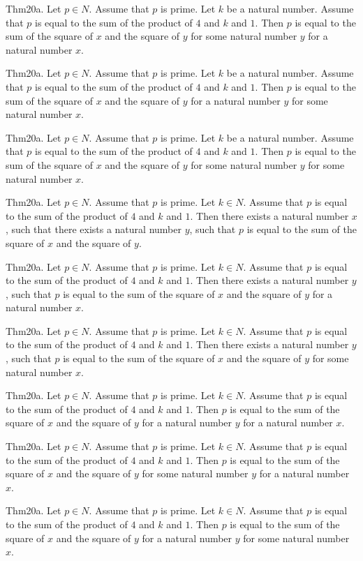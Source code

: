 \documentclass{article}
\begin{document}
Thm20a. Let $p \in N$. Assume that $p$ is prime. Let $k$ be a natural number. Assume that $p$ is equal to the sum of the product of $4$ and $k$ and $1$. Then $p$ is equal to the sum of the square of $x$ and the square of $y$ for some natural number $y$ for a natural number $x$.

Thm20a. Let $p \in N$. Assume that $p$ is prime. Let $k$ be a natural number. Assume that $p$ is equal to the sum of the product of $4$ and $k$ and $1$. Then $p$ is equal to the sum of the square of $x$ and the square of $y$ for a natural number $y$ for some natural number $x$.

Thm20a. Let $p \in N$. Assume that $p$ is prime. Let $k$ be a natural number. Assume that $p$ is equal to the sum of the product of $4$ and $k$ and $1$. Then $p$ is equal to the sum of the square of $x$ and the square of $y$ for some natural number $y$ for some natural number $x$.

Thm20a. Let $p \in N$. Assume that $p$ is prime. Let $k \in N$. Assume that $p$ is equal to the sum of the product of $4$ and $k$ and $1$. Then there exists a natural number $x$, such that there exists a natural number $y$, such that $p$ is equal to the sum of the square of $x$ and the square of $y$.

Thm20a. Let $p \in N$. Assume that $p$ is prime. Let $k \in N$. Assume that $p$ is equal to the sum of the product of $4$ and $k$ and $1$. Then there exists a natural number $y$, such that $p$ is equal to the sum of the square of $x$ and the square of $y$ for a natural number $x$.

Thm20a. Let $p \in N$. Assume that $p$ is prime. Let $k \in N$. Assume that $p$ is equal to the sum of the product of $4$ and $k$ and $1$. Then there exists a natural number $y$, such that $p$ is equal to the sum of the square of $x$ and the square of $y$ for some natural number $x$.

Thm20a. Let $p \in N$. Assume that $p$ is prime. Let $k \in N$. Assume that $p$ is equal to the sum of the product of $4$ and $k$ and $1$. Then $p$ is equal to the sum of the square of $x$ and the square of $y$ for a natural number $y$ for a natural number $x$.

Thm20a. Let $p \in N$. Assume that $p$ is prime. Let $k \in N$. Assume that $p$ is equal to the sum of the product of $4$ and $k$ and $1$. Then $p$ is equal to the sum of the square of $x$ and the square of $y$ for some natural number $y$ for a natural number $x$.

Thm20a. Let $p \in N$. Assume that $p$ is prime. Let $k \in N$. Assume that $p$ is equal to the sum of the product of $4$ and $k$ and $1$. Then $p$ is equal to the sum of the square of $x$ and the square of $y$ for a natural number $y$ for some natural number $x$.
\end{document}

